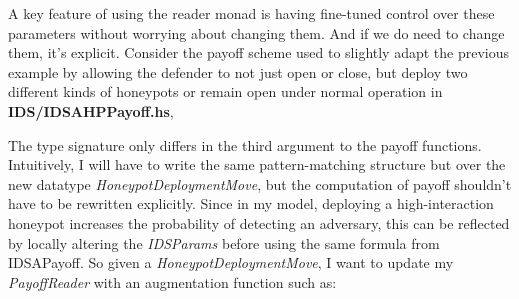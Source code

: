 A key feature of using the reader monad is having fine-tuned control over these parameters without worrying about changing them. And if we do need to change them, it's explicit. Consider the payoff scheme used to slightly adapt the previous example by allowing the defender to not just open or close, but deploy two different kinds of honeypots or remain open under normal operation in \textbf{IDS/IDSAHPPayoff.hs}, 

\begin{hscode}\SaveRestoreHook
	\>[B]{}\mathbin{::}\to {}\to {}\to {}\;\<[E]%
	\ColumnHook
\end{hscode}\resethooks

The type signature only differs in the third argument to the payoff functions. Intuitively, I will have to write the same pattern-matching structure but over the new datatype \textit{HoneypotDeploymentMove}, but the computation of payoff shouldn't have to be rewritten explicitly. Since in my model, deploying a high-interaction honeypot increases the probability of detecting an adversary, this can be reflected by locally altering the \textit{IDSParams} before using the same formula from IDSAPayoff. So given a \textit{HoneypotDeploymentMove}, I want to update my \textit{PayoffReader} with an augmentation function such as: 

\resethooks



